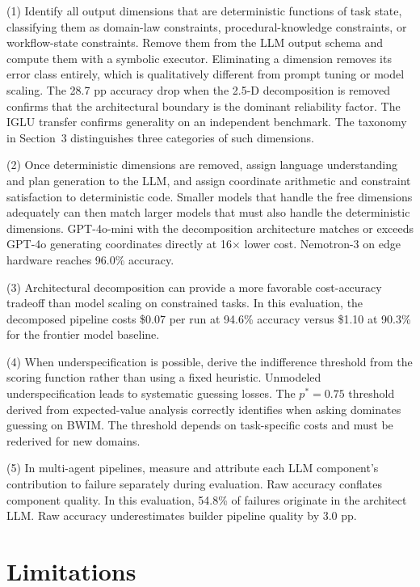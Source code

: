 \documentclass[10pt]{article}
\begin{document}
(1) Identify all output dimensions that are deterministic functions of task
state, classifying them as domain-law constraints, procedural-knowledge
constraints, or workflow-state constraints. Remove them from
the LLM output schema and compute them with a symbolic executor.
Eliminating a dimension removes its error class entirely, which is
qualitatively different from prompt tuning or model scaling.
The 28.7 pp accuracy drop when the 2.5-D decomposition is removed
confirms that the architectural boundary is the dominant reliability
factor. The IGLU transfer confirms generality on an independent
benchmark. The taxonomy in Section~3 distinguishes three categories of
such dimensions.

(2) Once deterministic dimensions are removed, assign language understanding
and plan generation to the LLM, and assign coordinate arithmetic and
constraint satisfaction to deterministic code. Smaller models that
handle the free dimensions adequately can then match larger models that
must also handle the deterministic dimensions. GPT-4o-mini with the
decomposition architecture matches or exceeds GPT-4o generating
coordinates directly at 16$\times$ lower cost. Nemotron-3 on edge
hardware reaches 96.0\% accuracy.

(3) Architectural decomposition can provide a more favorable cost-accuracy
tradeoff than model scaling on constrained tasks. In this evaluation,
the decomposed pipeline costs \$0.07 per run at 94.6\% accuracy versus
\$1.10 at 90.3\% for the frontier model baseline.

(4) When underspecification is possible, derive the indifference threshold
from the scoring function rather than using a fixed heuristic.
Unmodeled underspecification leads to systematic guessing losses. The
$p^* = 0.75$ threshold derived from expected-value analysis correctly
identifies when asking dominates guessing on BWIM. The threshold
depends on task-specific costs and must be rederived for new domains.

(5) In multi-agent pipelines, measure and attribute each LLM component's
contribution to failure separately during evaluation. Raw accuracy
conflates component quality. In this evaluation, 54.8\% of failures
originate in the architect LLM. Raw accuracy underestimates builder
pipeline quality by 3.0 pp.


\section{Limitations}
\end{document}

